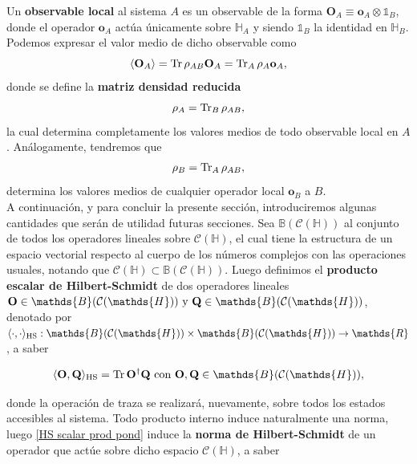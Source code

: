 \documentclass{report} %
\newcommand{\lgg}{\langle}
\newcommand{\rgg}{\rangle}
\numberwithin{equation}{section}
\begin{document}
Un \textbf{observable local} al sistema $A$ es un observable de la forma $\mathbf{O}_A \equiv \mathbf{o}_A \otimes \mathds{1}_B$, donde el operador $\mathbf{o}_A$ actúa únicamente sobre $\mathbb{H}_{A}$ y siendo $\mathds{1}_B$ la identidad en $\mathbb{H}_B$. Podemos expresar el valor medio de dicho observable como
 \begin{equation}
    \langle \mathbf{O}_A \rangle = \Tr\rho_{AB}\mathbf{O}_A = \Tr_{A} \rho_A \mathbf{o}_A,
 \end{equation}
donde se define la \textbf{matriz densidad reducida} \cite{Nielsen.00}
\begin{equation}
    \rho_A = \Tr_{B}\rho_{AB},
\end{equation}
la cual determina completamente los valores medios de todo observable local en $A$. Análogamente, tendremos que 
\begin{equation}
    \rho_B = \Tr_{A} \rho_{AB},
\end{equation}
determina los valores medios de cualquier operador local $\mathbf{o}_B$ a $B$. \\

A continuación, y para concluir la presente sección, introduciremos algunas cantidades que serán de utilidad futuras secciones. Sea  $\mathds{B}(\mathcal{C}(\mathds{H}))$ al conjunto de todos los operadores lineales sobre $\mathcal{C}(\mathds{H})$, el cual tiene la estructura de un espacio vectorial respecto al cuerpo de los números complejos con las operaciones usuales, notando que $\mathcal{C}(\mathds{H}) \subset \mathds{B}(\mathcal{C}(\mathds{H}))$. Luego definimos el \textbf{producto escalar de Hilbert-Schmidt} \cite{BCHallp, HeinzPetruccione} de dos operadores lineales $\mathbf{O} \in  \mathds{B}(\mathcal{C}(\mathds{H})) \textnormal{ y } \mathbf{Q} \in \mathds{B}(\mathcal{C}(\mathds{H})) $, denotado por $\lgg\cdot,\cdot\rgg_{\textnormal{HS}}: \mathds{B}(\mathcal{C}(\mathds{H})) \times \mathds{B}(\mathcal{C}(\mathds{H}))  \rightarrow \mathds{R}$, a saber

\begin{equation}
    \lgg\mathbf{O},\mathbf{Q}\rgg_{\textnormal{HS}} = \Tr\mathbf{O}^{\dagger}\mathbf{Q} \textnormal{ con } {\bf O}, {\bf Q}\in \mathds{B}(\mathcal{C}(\mathds{H})),
    \label{HS scalar prod}
\end{equation}

\noindent donde la operación de traza se realizará, nuevamente, sobre todos los estados accesibles al sistema. Todo producto interno induce naturalmente una norma, luego \ref{HS scalar prod pond} induce la \textbf{norma de Hilbert-Schmidt} de un operador que actúe sobre dicho espacio $\mathcal{C}(\mathds{H})$, a saber
\end{document}

